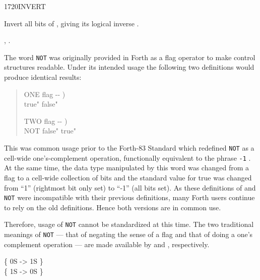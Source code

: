 \begin{worddef}{1720}{INVERT}
\item {}

	Invert all bits of , giving its logical inverse
	.

\see {},
	.

	\begin{defer}
	\rationale %
		The word \texttt{NOT} was originally provided in Forth as a
		flag operator to make control structures readable. Under its
		intended usage the following two definitions would produce
		identical results:

		\begin{quote}\ttfamily
			\word{:} ONE  flag -{}- ) \\
			\tab {}
					 true"
					 false"
			\word{;}

			\word{:} TWO  flag -{}- ) \\
			\tab NOT 
					 false"
					 true"
			\word{;}
		\end{quote}

		This was common usage prior to the Forth-83 Standard which
		redefined \texttt{NOT} as a cell-wide one's-complement
		operation, functionally equivalent to the phrase \texttt{-1}
		. At the same time, the data type manipulated by
		this word was changed from a flag to a cell-wide collection of
		bits and the standard value for true was changed from ``1''
		(rightmost bit only set) to ``-1'' (all bits set). As these
		definitions of  and \texttt{NOT} were incompatible
		with their previous definitions, many Forth users continue to
		rely on the old definitions. Hence both versions are in common
		use.

		Therefore, usage of \texttt{NOT} cannot be standardized at
		this time. The two traditional meanings of \texttt{NOT} ---
		that of negating the sense of a flag and that of doing a one's
		complement operation --- are made available by  and
		, respectively.

	\testing
		\{ 0S  -> 1S \} \\
		\{ 1S  -> 0S \}
	\end{defer}
\end{worddef}


